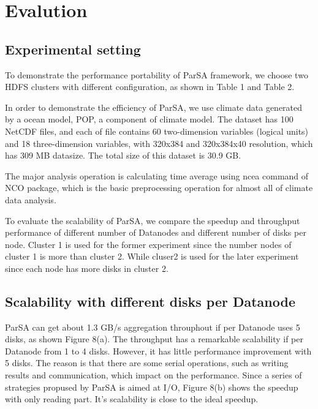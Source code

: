 \documentclass[preprint,12pt]{elsarticle}
\begin{document}
\section{Evalution}

\subsection{Experimental setting}
To demonstrate the performance portability of ParSA framework, we choose two HDFS clusters with different configuration, as shown in Table
1 and Table 2. \par
In order to demonstrate the efficiency of ParSA, we use climate data generated by a ocean model, POP, a component of climate model. The 
dataset has 100 NetCDF files, and each of file contains 60 two-dimension variables (logical units) and 18 three-dimension variables, with
320x384 and 320x384x40 resolution, which has 309 MB datasize. The total size of this dataset is 30.9 GB. \par 
The major analysis operation is calculating time average using ncea command of NCO package, which is the basic preprocessing operation
for almost all of climate data analysis. \par
To evaluate the scalability of ParSA, we compare the speedup and throughput performance of different number of Datanodes and different
number of disks per node. Cluster 1 is used for the former experiment since the number nodes of cluster 1 is more than cluster 2. While 
cluser2 is used for the later experiment since each node has more disks in cluster 2. \par 

\subsection{Scalability with different disks per Datanode}
ParSA can get about 1.3 GB/s aggregation throuphout if per Datanode uses 5 disks, as shown Figure 8(a). The throughput has a remarkable 
scalability if per Datanode from 1 to 4 disks. However, it has little performance improvement with 5 disks. The reason is that there are
some serial operations, such as writing results and communication, which impact on the performance. Since a series of strategies propused
by ParSA is aimed at I/O, Figure 8(b) shows the speedup with only reading part. It's scalability is close to the ideal speedup. 
\end{document}
